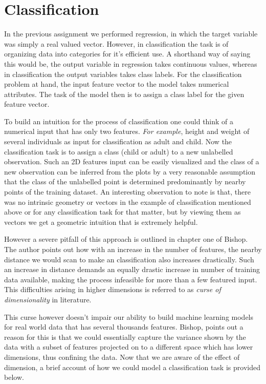 \section*{}
\section*{Classification}
  In the previous assignment we performed regression, in which the target variable was simply a real valued vector. However, in classification the task is of organizing data into categories for it's efficient use. A shorthand way of saying this would be, the output variable in regression takes continuous values, whereas in classification the output variables takes class labels. For the classification problem at hand, the input feature vector to the model takes numerical attributes. The task of the model then is to assign a class label for the given feature vector.
 
 To build an intuition for the process of classification one could think of a numerical input that has only two features. \textit{For example}, height and weight of several individuals as input for classification as adult and child. Now the classification task is to assign a class (child or adult) to a new unlabelled observation. Such an 2D features input can be easily visualized and the class of a new observation can be inferred from the plots by a very reasonable assumption that the class of the unlabelled point is determined predominantly by nearby points of the training dataset. An interesting observation to note is that, there  was  no  intrinsic  geometry  or  vectors in the example of classification mentioned above or for any classification task for that matter, but by viewing them as vectors we get a geometric intuition that is extremely helpful.
 
 However a severe pitfall of this approach is outlined in chapter one of Bishop. The author points out how with an increase in the number of features, the nearby distance we would scan to make an classification also increases drastically. Such an increase in distance demands an equally drastic increase in number of training data available, making the process infeasible for more than a few featured input. This difficulties arising in higher dimensions is referred to as \textit{curse of dimensionality} in literature. 
 
 This curse however doesn't impair our ability to build machine learning models for real world data that has several thousands features. Bishop, points out a reason for this is that we could essentially capture the variance shown by the data with a subset of features projected on to a different space which has lower dimensions, thus confining the data. Now that we are aware of the effect of dimension, a brief account of how we could model a classification task is provided below. 
 
